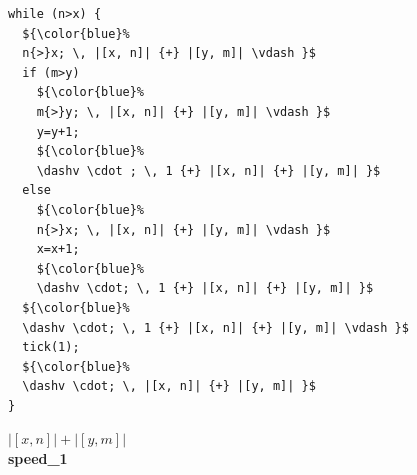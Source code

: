 \documentclass[nocopyrightspace,preprint,pldi]{sigplanconf-pldi15}
\begin{document}
\begin{figure}
 \setlength{\progwidth}{.22\linewidth}
  \centering
\vspace{-.6cm}
\hspace{-0.4cm}
  \begin{minipage}[b]{.18\linewidth}
    \begin{center}
   \begin{lstlisting}[]
while (n>x) {
  ${\color{blue}%
  n{>}x; \, |[x, n]| {+} |[y, m]| \vdash }$
  if (m>y)
    ${\color{blue}%
    m{>}y; \, |[x, n]| {+} |[y, m]| \vdash }$
    y=y+1;
    ${\color{blue}%
    \dashv \cdot ; \, 1 {+} |[x, n]| {+} |[y, m]| }$
  else
    ${\color{blue}%
    n{>}x; \, |[x, n]| {+} |[y, m]| \vdash }$
    x=x+1;
    ${\color{blue}%
    \dashv \cdot; \, 1 {+} |[x, n]| {+} |[y, m]| }$
  ${\color{blue}%
  \dashv \cdot; \, 1 {+} |[x, n]| {+} |[y, m]| \vdash }$
  tick(1);
  ${\color{blue}%
  \dashv \cdot; \, |[x, n]| {+} |[y, m]| }$
}
   \end{lstlisting}
\vspace{-2.5ex}
$|[x, n]| + |[y, m]|$
\\[.4\baselineskip]
      {\bf speed\_1}
    \end{center}
  \end{minipage}
%
\hfill
%
  \begin{minipage}[b]{\progwidth}
    \begin{center}
   \begin{lstlisting}


\end{lstlisting}
\end{center}
\end{minipage}
\end{figure}
\end{document}
